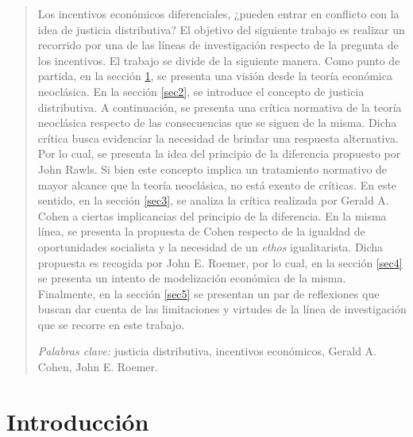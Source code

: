 \documentclass[11pt]{article}
\begin{document}
\begin{quote}
\small

    Los incentivos económicos diferenciales, ¿pueden entrar en conflicto con la idea de justicia distributiva? El objetivo del siguiente trabajo es realizar un recorrido por una de las líneas de investigación respecto de la pregunta de los incentivos. El trabajo se divide de la siguiente manera. Como punto de partida, en la sección \ref{sec1}, se presenta una visión desde la teoría económica neoclásica. En la sección \ref{sec2}, se introduce el concepto de justicia distributiva. A continuación, se presenta una crítica normativa de la teoría neoclásica respecto de las consecuencias que se siguen de la misma. Dicha crítica busca evidenciar la necesidad de brindar una respuesta alternativa. Por lo cual, se presenta la idea del principio de la diferencia propuesto por John Rawls. Si bien este concepto implica un tratamiento normativo de mayor alcance que la teoría neoclásica, no está exento de críticas. En este sentido, en la sección \ref{sec3}, se analiza la crítica realizada por Gerald A. Cohen a ciertas implicancias del principio de la diferencia. En la misma línea, se presenta la propuesta de Cohen respecto de la igualdad de oportunidades socialista y la necesidad de un \textit{ethos} igualitarista. Dicha propuesta es recogida por John E. Roemer, por lo cual, en la sección \ref{sec4} se presenta un intento de modelización económica de la misma. Finalmente, en la sección \ref{sec5} se presentan un par de reflexiones que buscan dar cuenta de las limitaciones y virtudes de la línea de investigación que se recorre en este trabajo.
    
    \vspace{5mm}
    
    \textit{Palabras clave:} justicia distributiva, incentivos económicos, Gerald A. Cohen, John E. Roemer.
\end{quote}


\newpage 



\normalsize



\doublespacing
\tableofcontents
\thispagestyle{empty}
\newpage

\doublespacing
\renewcommand*{\thefootnote}{\arabic{footnote}}
\setcounter{footnote}{0}


\doublespacing
\section{Introducción} \label{sec1}

\end{document}
